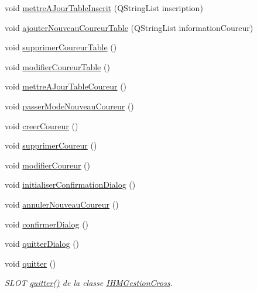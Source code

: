\begin{DoxyCompactItemize}
\item 
void \hyperlink{class_i_h_m_gestion_cross_a3c96fb9d92e9392ea83b380c3648bf55}{mettre\+A\+Jour\+Table\+Inscrit} (Q\+String\+List inscription)
\item 
void \hyperlink{class_i_h_m_gestion_cross_aa3e6f06ff2f4e724e2f0688528bcf386}{ajouter\+Nouveau\+Coureur\+Table} (Q\+String\+List information\+Coureur)
\item 
void \hyperlink{class_i_h_m_gestion_cross_af13fabb9831fcd237c9c1e7ee75c47b8}{supprimer\+Coureur\+Table} ()
\item 
void \hyperlink{class_i_h_m_gestion_cross_a3a969f85f31f25ed6df6a75a1cee2de1}{modifier\+Coureur\+Table} ()
\item 
void \hyperlink{class_i_h_m_gestion_cross_a53c84315d723d75ad7b4a7d4c317efc5}{mettre\+A\+Jour\+Table\+Coureur} ()
\item 
void \hyperlink{class_i_h_m_gestion_cross_ac8f336c95a5f0c9eb8a4bc1c4bb83445}{passer\+Mode\+Nouveau\+Coureur} ()
\item 
void \hyperlink{class_i_h_m_gestion_cross_a6000b152ba3febb45d6c409519168ba2}{creer\+Coureur} ()
\item 
void \hyperlink{class_i_h_m_gestion_cross_a4fd00fda0e47366d66d046e344a1617e}{supprimer\+Coureur} ()
\item 
void \hyperlink{class_i_h_m_gestion_cross_a1f41cea488ab477505f9d1792c4c2f36}{modifier\+Coureur} ()
\item 
void \hyperlink{class_i_h_m_gestion_cross_a1d3c7f83d4c960f38b237499d2a89731}{initialiser\+Confirmation\+Dialog} ()
\item 
void \hyperlink{class_i_h_m_gestion_cross_a1bf6838771bef4796def7a5ba58d74b3}{annuler\+Nouveau\+Coureur} ()
\item 
void \hyperlink{class_i_h_m_gestion_cross_a144933ab31ae263be7267b93bfd53a82}{confirmer\+Dialog} ()
\item 
void \hyperlink{class_i_h_m_gestion_cross_a58b19fa84a16060a3dd951abeba2c543}{quitter\+Dialog} ()
\item 
void \hyperlink{class_i_h_m_gestion_cross_a9c24746993f720c1067cfe7396ecd5c4}{quitter} ()
\begin{DoxyCompactList}\small\item\em S\+L\+OT \hyperlink{class_i_h_m_gestion_cross_a9c24746993f720c1067cfe7396ecd5c4}{quitter()} de la classe \hyperlink{class_i_h_m_gestion_cross}{I\+H\+M\+Gestion\+Cross}. \end{DoxyCompactList}\end{DoxyCompactItemize}
